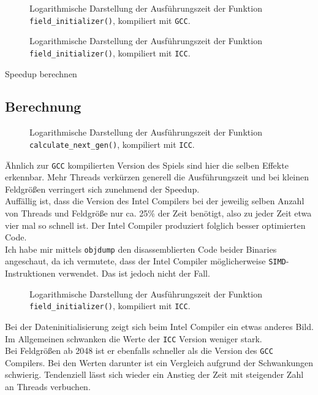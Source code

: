 \documentclass[german,plainarticle,hyperref,utf8]{zihpub}
\begin{document}
	\begin{figure}[h]
		\centering
		
		\caption{Logarithmische Darstellung der Ausführungszeit der Funktion \texttt{field\_initializer()}, kompiliert mit \texttt{GCC}.}
	\end{figure}
	\begin{figure}[h]
		\centering
		
		\caption{Logarithmische Darstellung der Ausführungszeit der Funktion \texttt{field\_initializer()}, kompiliert mit \texttt{ICC}.}
	\end{figure}

	Speedup berechnen
	
	\newpage
	\subsection{Berechnung}
	\begin{figure}[h]
		\begin{center}
			
		\end{center}
		\caption{Logarithmische Darstellung der Ausführungszeit der Funktion \texttt{calculate\_next\_gen()}, kompiliert mit \texttt{ICC}.}
	\end{figure}
	Ähnlich zur \texttt{GCC} kompilierten Version des Spiels sind hier die selben Effekte erkennbar. Mehr Threads verkürzen generell die Ausführungszeit und bei kleinen Feldgrößen verringert sich zunehmend der Speedup.\\
	Auffällig ist, dass die Version des Intel Compilers bei der jeweilig selben Anzahl von Threads und Feldgröße nur ca. 25\% der Zeit benötigt, also zu jeder Zeit etwa vier mal so schnell ist. Der Intel Compiler produziert folglich besser optimierten Code.\\
	Ich habe mir mittels \texttt{objdump} den disassemblierten Code beider Binaries angeschaut, da ich vermutete, dass der Intel Compiler möglicherweise \texttt{SIMD}-Instruktionen verwendet. Das ist jedoch nicht der Fall.
	\newpage
	\begin{figure}[h]
		\begin{center}
			
		\end{center}
		\caption{Logarithmische Darstellung der Ausführungszeit der Funktion \texttt{field\_initializer()}, kompiliert mit \texttt{ICC}.}
	\end{figure}
	Bei der Dateninitialisierung zeigt sich beim Intel Compiler ein etwas anderes Bild. Im Allgemeinen schwanken die Werte der \texttt{ICC} Version weniger stark.\\
	Bei Feldgrößen ab 2048 ist er ebenfalls schneller als die Version des \texttt{GCC} Compilers. Bei den Werten darunter ist ein Vergleich aufgrund der Schwankungen schwierig. Tendenziell lässt sich wieder ein Anstieg der Zeit mit steigender Zahl an Threads verbuchen.
	\newpage
	\appendix
\end{document}
